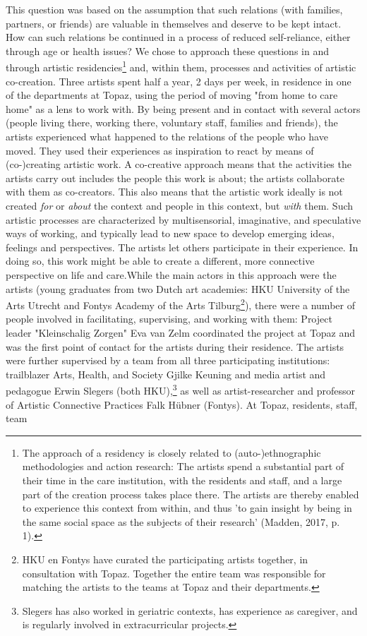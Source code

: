 \documentclass[authordate, empirical,issue]{jote-new-article}
\begin{document}
	{
	

	This question was based on the assumption that such relations (with families, partners, or friends) are valuable in themselves and deserve to be kept intact. How can such relations be continued in a process of reduced self-reliance, either through age or health issues? We chose to approach these questions in and through artistic residencies\footnote{The approach of a residency is closely related to \linebreak (auto-)ethnographic methodologies and action research: The artists spend a substantial part of their time in the care institution, with the residents and staff, and a large part of the creation process takes place there. The artists are thereby enabled to experience this context from within, and thus 'to gain insight by being in the same social space as the subjects of their research' (Madden, 2017, p. 1).} and, within them, processes and activities of artistic co-creation. Three artists spent half a year, 2 days per week, in residence in one of the departments at Topaz, using the period of moving "from home to care home" as a lens to work with. By being present and in contact with several actors (people living there, working there, voluntary staff, families and friends), the artists experienced what happened to the relations of the people who have moved. They used their experiences as inspiration to react by means of (co-)creating artistic work. A co-creative approach means that the activities the artists carry out includes the people this work is about; the artists collaborate with them as co-creators. This also means that the artistic work ideally is not created \emph{for} or \emph{about }the context and people in this context, but \emph{with} them. Such artistic processes are characterized by multisensorial, imaginative, and speculative ways of working, and typically lead to new space to develop emerging ideas, feelings and perspectives. The artists let others participate in their experience. In doing so, this work might be able to create a different, more connective perspective on life and care.While the main actors in this approach were the artists (young graduates from two Dutch art academies: HKU University of the Arts Utrecht and Fontys Academy of the Arts Tilburg\footnote{ HKU en Fontys have curated the participating artists together, in consultation with Topaz. Together the entire team was responsible for matching the artists to the teams at Topaz and their departments.}), there were a number of people involved in facilitating, supervising, and working with them: Project leader "Kleinschalig Zorgen" Eva van Zelm coordinated the project at Topaz and was the first point of contact for the artists during their residence. The artists were further supervised by a team from all three participating institutions: trailblazer Arts, Health, and Society Gjilke Keuning and media artist and pedagogue Erwin Slegers (both HKU),\footnote{ Slegers has also worked in geriatric contexts, has experience as caregiver, and is regularly involved in extracurricular projects. } as well as artist-researcher and professor of Artistic Connective Practices Falk Hübner (Fontys). At Topaz, residents, staff, team }
\end{document}
